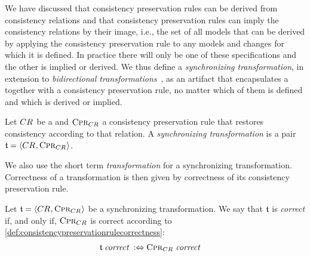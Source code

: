We have discussed that consistency preservation rules can be derived from consistency relations and that consistency preservation rules can imply the consistency relations by their image, i.e., the set of all models that can be derived by applying the consistency preservation rule to any models and changes for which it is defined.
In practice there will only be one of these specifications and the other is implied or derived.
We thus define a \emph{synchronizing transformation}, in extension to \emph{bidirectional transformations}~\cite{stevens2010sosym}, as an artifact that encapsulates a \modellevelconsistencyrelation together with a consistency preservation rule, no matter which of them is defined and which is derived or implied.

\begin{definition}
    \label{def:synchronizingtransformation}
    Let $\consistencyrelation{CR}{}$ be a \modellevelconsistencyrelation and $\consistencypreservationrule{\consistencyrelation{CR}{}}$ a consistency preservation rule that restores consistency according to that relation.
    A \emph{synchronizing transformation} is a pair $\transformation{t} = \tupled{\consistencyrelation{CR}{}, \consistencypreservationrule{\consistencyrelation{CR}{}}}$.
\end{definition}

We also use the short term \emph{transformation} for a synchronizing transformation.
Correctness of a transformation is then given by correctness of its consistency preservation rule.

\begin{definition}
    \label{def:synchronizingtransformationcorrectness}
    Let $\transformation{t} = \tupled{\consistencyrelation{CR}{}, \consistencypreservationrule{\consistencyrelation{CR}{}}}$ be a synchronizing transformation.
    We say that $\transformation{t}$ is \emph{correct} if, and only if, $\consistencypreservationrule{\consistencyrelation{CR}{}}$ is correct according to \autoref{def:consistencypreservationrulecorrectness}:
    \begin{align*}
        &
        \transformation{t} \correctmath \equivalentperdefinition \consistencypreservationrule{\consistencyrelation{CR}{}} \correctmath
    \end{align*}
\end{definition}

